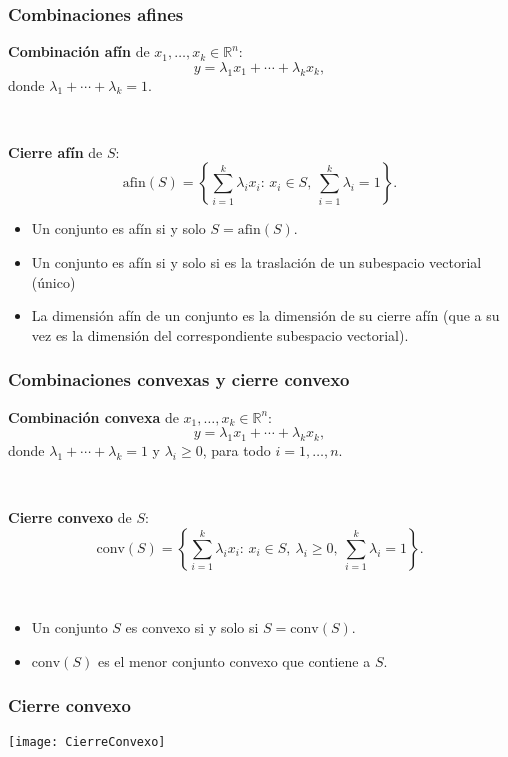 \documentclass{beamer}
\begin{document}
\begin{frame}
\frametitle{Combinaciones afines}

\textbf{Combinación afín} de $x_1,\ldots,x_k \in\mathbb{R}^n$:
\[
y = \lambda_1 x_1+\cdots +\lambda_k x_k,
\]
donde $\lambda_1+\cdots +\lambda_k=1$.

\

\textbf{Cierre afín} de $S$:
\[
\mbox{afin}(S) = \left\{\sum_{i=1}^k \lambda_i x_i:\, x_i\in S,\  \sum_{i=1}^k \lambda_i = 1\right\}.
\]

\begin{itemize}
\item Un conjunto es afín si y solo $S=\mbox{afin}(S)$.

\item Un conjunto es afín si y solo si es la traslación de un subespacio vectorial (único)

\item La dimensión afín de un conjunto es la dimensión de su cierre afín (que a su vez es la dimensión del correspondiente subespacio vectorial).
\end{itemize}


\end{frame}
\begin{frame}
\frametitle{Combinaciones convexas y cierre convexo}

\textbf{Combinación convexa} de $x_1,\ldots,x_k \in\mathbb{R}^n$:
\[
y = \lambda_1 x_1+\cdots +\lambda_k x_k,
\]
donde $\lambda_1+\cdots +\lambda_k=1$ y $\lambda_i \geq 0$, para todo $i=1,\ldots,n$.

\




\textbf{Cierre convexo} de $S$:
\[
\mbox{conv}(S) = \left\{\sum_{i=1}^k \lambda_i x_i:\, x_i\in S,\ \lambda_i\geq 0,\ \sum_{i=1}^k \lambda_i = 1\right\}.
\]

\

\begin{itemize}
\item Un conjunto $S$ es convexo si y solo si $S=\mbox{conv}(S)$.
\item $\mbox{conv}(S)$ es el menor conjunto convexo que contiene a $S$.
\end{itemize}


\end{frame}
\begin{frame}
\frametitle{Cierre convexo}

\begin{center}
\texttt{[image: CierreConvexo]}
\end{center}

\end{frame}
\end{document}
